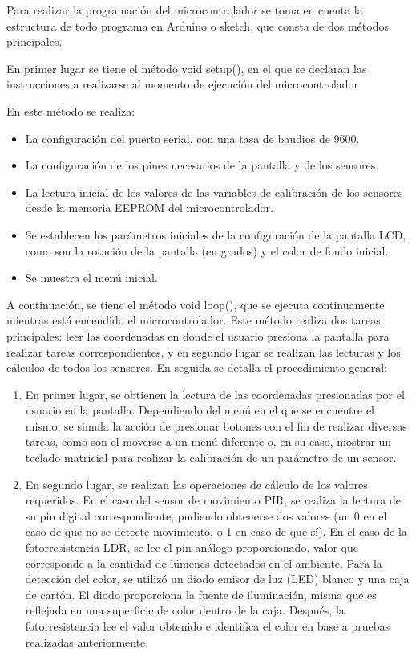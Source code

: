 \documentclass[conference]{IEEEtran}
\begin{document}
Para realizar la programación del microcontrolador se toma en cuenta la estructura de todo programa en Arduino o sketch, que consta de dos métodos principales.

En primer lugar se tiene el método void setup(), en el que se declaran las instrucciones a realizarse al momento de ejecución del microcontrolador

En este método se realiza:
\begin{itemize}
  \item La configuración del puerto serial, con una tasa de baudios de 9600.
  \item La configuración de los pines necesarios de la pantalla y de los sensores.
  \item La lectura inicial de los valores de las variables de calibración de los sensores desde la memoria EEPROM del microcontrolador.
  \item Se establecen los parámetros iniciales de la configuración de la pantalla LCD, como son la rotación de la pantalla (en grados) y el color de fondo inicial.
  \item Se muestra el menú inicial.
\end{itemize}

A continuación, se tiene el método void loop(), que se ejecuta continuamente mientras está encendido el microcontrolador. Este método realiza dos tareas principales: leer las coordenadas en donde el usuario presiona la pantalla para realizar tareas correspondientes, y en segundo lugar se realizan las lecturas y los cálculos de todos los sensores. En seguida se detalla el procedimiento general:
\begin{enumerate}
  \item En primer lugar, se obtienen la lectura de las coordenadas presionadas por el usuario en la pantalla. Dependiendo del menú en el que se encuentre el mismo, se simula la acción de presionar botones con el fin de realizar diversas tareas, como son el moverse a un menú diferente o, en su caso, mostrar un teclado matricial para realizar la calibración de un parámetro de un sensor.
  \item En segundo lugar, se realizan las operaciones de cálculo de los valores requeridos. En el caso del sensor de movimiento PIR, se realiza la lectura de su pin digital correspondiente, pudiendo obtenerse dos valores (un 0 en el caso de que no se detecte movimiento, o 1 en caso de que sí). En el caso de la fotorresistencia LDR, se lee el pin análogo proporcionado, valor que corresponde a la cantidad de lúmenes detectados en el ambiente. Para la detección del color, se utilizó un diodo emisor de luz (LED) blanco y una caja de cartón. El diodo proporciona la fuente de iluminación, misma que es reflejada en una superficie de color dentro de la caja. Después, la fotorresistencia lee el valor obtenido e identifica el color en base a pruebas realizadas anteriormente.
\end{enumerate}
\end{document}
